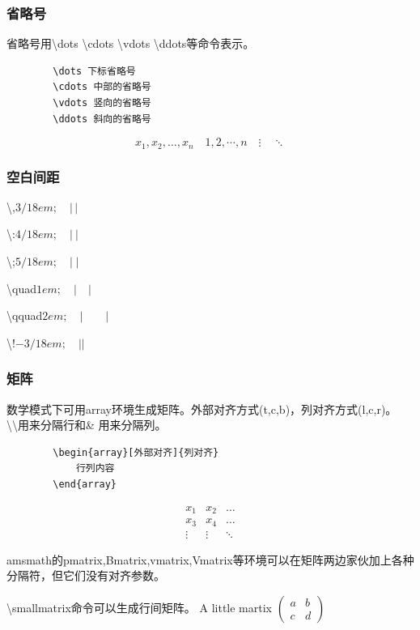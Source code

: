 \documentclass[16pt]{article}
\begin{document}
\subsubsection{省略号}
    省略号用\textbackslash dots \textbackslash cdots \textbackslash vdots \textbackslash ddots等命令表示。
    \begin{lstlisting}
        \dots 下标省略号
        \cdots 中部的省略号
        \vdots 竖向的省略号
        \ddots 斜向的省略号 
    \end{lstlisting}
    \[x_1,x_2,\dots,x_n\quad 1,2,\cdots,n \quad \vdots \quad \ddots\]
\subsubsection{空白间距}
    \textbackslash ,\quad $3/18em; \quad |\,| \quad$ \par
    \textbackslash :\quad $4/18em; \quad |\:| \quad$ \par
    \textbackslash ;\quad $5/18em; \quad |\;| \quad$ \par
    \textbackslash quad\quad $1em; \quad |\quad| \quad$ \par
    \textbackslash qquad\quad $2em; \quad |\qquad| \quad$ \par
    \textbackslash !\quad $-3/18em; \quad |\!| \quad$
\subsubsection{矩阵}
    数学模式下可用array环境生成矩阵。外部对齐方式(t,c,b)，列对齐方式(l,c,r)。\textbackslash \textbackslash 用来分隔行和\& 用来分隔列。
    \begin{lstlisting}
        \begin{array}[外部对齐]{列对齐}
            行列内容
        \end{array}
    \end{lstlisting}
    \[
        \begin{array}{ccc}
            x_1     &       x_2     &   \dots \\
            x_3     &       x_4     &   \dots \\
            \vdots  &       \vdots  &   \ddots 
        \end{array}
        \]
    \par
    amsmath的pmatrix,Bmatrix,vmatrix,Vmatrix等环境可以在矩阵两边家伙加上各种分隔符，但它们没有对齐参数。 \par
    \textbackslash smallmatrix命令可以生成行间矩阵。
    A little martix 
    $(
        \begin{smallmatrix}
            a   &   b   \\
            c   &   d
        \end{smallmatrix}
    )$
\end{document}
